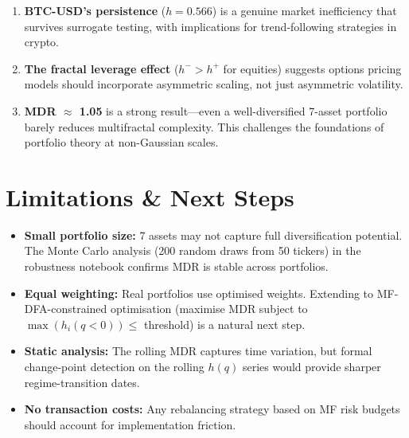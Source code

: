 \documentclass[11pt,a4paper]{article}
\begin{document}
\begin{enumerate}[nosep, start=7]
\item \textbf{BTC-USD's persistence} ($h = 0.566$) is a genuine market inefficiency that survives surrogate testing, with implications for trend-following strategies in crypto.

\item \textbf{The fractal leverage effect} ($h^- > h^+$ for equities) suggests options pricing models should incorporate asymmetric scaling, not just asymmetric volatility.

\item \textbf{MDR $\approx$ 1.05} is a strong result---even a well-diversified 7-asset portfolio barely reduces multifractal complexity. This challenges the foundations of portfolio theory at non-Gaussian scales.
\end{enumerate}

\section{Limitations \& Next Steps}

\begin{itemize}[nosep]
\item \textbf{Small portfolio size:} 7 assets may not capture full diversification potential. The Monte Carlo analysis (200 random draws from 50 tickers) in the robustness notebook confirms MDR is stable across portfolios.

\item \textbf{Equal weighting:} Real portfolios use optimised weights. Extending to MF-DFA-constrained optimisation (maximise MDR subject to $\max(h_i(q<0)) \leq$ threshold) is a natural next step.

\item \textbf{Static analysis:} The rolling MDR captures time variation, but formal change-point detection on the rolling $h(q)$ series would provide sharper regime-transition dates.

\item \textbf{No transaction costs:} Any rebalancing strategy based on MF risk budgets should account for implementation friction.
\end{itemize}
\end{document}
